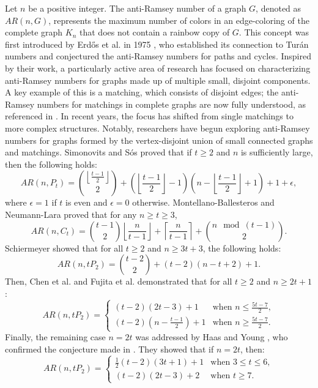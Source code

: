 \documentclass[12pt]{article}
\begin{document}
Let \( n \) be a positive integer. The anti-Ramsey number of a graph \( G \), denoted as \( AR(n, G) \), represents the maximum number of colors in an edge-coloring of the complete graph \( K_n \) that does not contain a rainbow copy of \( G \). This concept was first introduced by Erdős et al. in 1975 \cite{Er1}, who established its connection to Turán numbers and conjectured the anti-Ramsey numbers for paths and cycles. Inspired by their work, a particularly active area of research has focused on characterizing anti-Ramsey numbers for graphs made up of multiple small, disjoint components. A key example of this is a matching, which consists of disjoint edges; the anti-Ramsey numbers for matchings in complete graphs are now fully understood, as referenced in \cite{p1-2,p1-5,p1-7,p1-9,p1-14}. In recent years, the focus has shifted from single matchings to more complex structures. Notably, researchers have begun exploring anti-Ramsey numbers for graphs formed by the vertex-disjoint union of small connected graphs and matchings.
Simonovits and Sós \cite{p2-10} proved that if \( t \geq 2 \) and \( n \) is sufficiently large, then the following holds:
\[
AR(n,P_t) = {\left\lfloor\frac{t-1}{2}\right\rfloor\choose2} + \left( \left\lfloor\frac{t-1}{2}\right\rfloor - 1 \right) \left(n - \left\lfloor\frac{t-1}{2}\right\rfloor + 1\right) + 1 + \epsilon,
\]
where \( \epsilon = 1 \) if \( t \) is even and \( \epsilon = 0 \) otherwise.
Montellano-Ballesteros and Neumann-Lara \cite{p3-6} proved that for any \( n \geq t \geq 3 \),
\[
AR(n,C_t) = {t-1\choose2} \left\lfloor\frac{n}{t-1}\right\rfloor + \left\lceil\frac{n}{t-1}\right\rceil + {n \mod (t-1) \choose 2}.
\]
Schiermeyer \cite{p2-9} showed that for all \( t \geq 2 \) and \( n \geq 3t + 3 \), the following holds:
\[
AR(n,tP_2) = {t-2 \choose 2} + (t-2)(n - t + 2) + 1.
\]
Then, Chen et al. \cite{p1-2} and Fujita et al. \cite{p1-5} demonstrated that for all \( t \geq 2 \) and \( n \geq 2t + 1 \):
\[
AR(n,tP_2) = \begin{cases} 
(t-2)(2t-3) + 1 & \text{when } n \leq \frac{5t-7}{2}, \\ 
(t-2)(n - \frac{t-1}{2}) + 1 & \text{when } n \geq \frac{5t-7}{2}. 
\end{cases}
\]
Finally, the remaining case \( n = 2t \) was addressed by Haas and Young \cite{p1-7}, who confirmed the conjecture made in \cite{p1-5}. They showed that if \( n = 2t \), then:
\[
AR(n,tP_2) = \begin{cases} 
\frac{1}{2}(t-2)(3t+1) + 1 & \text{when } 3 \leq t \leq 6, \\ 
(t-2)(2t-3) + 2 & \text{when } t \geq 7. 
\end{cases}
\]
\end{document}
